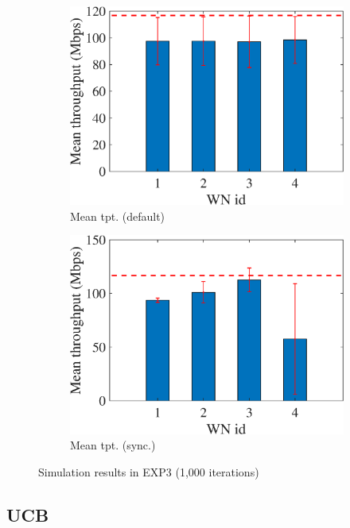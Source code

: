 \documentclass[preprint,12pt]{article}
\begin{document}
\begin{figure}[h!]
	\begin{subfigure}[b]{.3\textwidth}
		\includegraphics[width=\textwidth]{images/mean_tpt_EXP3}
		\caption{Mean tpt. (default)}\label{fig:mean_tpt_EXP3}
	\end{subfigure}
	\begin{subfigure}[b]{.3\textwidth}
		\includegraphics[width=\textwidth]{images/mean_tpt_CEXP3}
		\caption{Mean tpt. (sync.)}\label{fig:mean_tpt_CEXP3}
	\end{subfigure}
	\caption{Simulation results in EXP3 (1,000 iterations)}
	\label{fig:exp3}
\end{figure}

\subsection{UCB}
\label{section:ucb}
\end{document}
